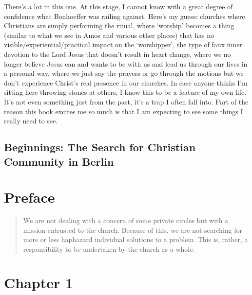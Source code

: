 There's a lot in this one. At this stage, I cannot know with a great degree of
confidence what Bonhoeffer was railing against. Here's my guess: churches where
Christians are simply performing the ritual, where `worship' becomes a thing
(similar to what we see in Amos and various other places) that has no
visible/experiential/practical impact on the `worshipper', the type of faux
inner devotion to the Lord Jesus that doesn't result in heart change, where we
no longer believe Jesus can and wants to be with us and lead us through our
lives in a personal way, where we just say the prayers or go through the motions
but we don't experience Christ's real presence in our churches. In case anyone
thinks I'm sitting here throwing stones at others, I know this to be a feature
of my own life. It's not even something just from the past, it's a trap I often
fall into. Part of the reason this book excites me so much is that I am
expecting to see some things I really need to see.

\subsection{Beginnings: The Search for Christian Community in Berlin}

\section{Preface}

\begin{quote}
    We are not dealing with a concern of some private circles but with a mission
    entrusted to the church. Because of this, we are not searching for more or
    less haphazard individual solutions to a problem. This is, rather, a
    responsibility to be undertaken by the church as a whole.
    \autocite[25]{bonhoeffer:1996}
\end{quote}

\section{Chapter 1}


